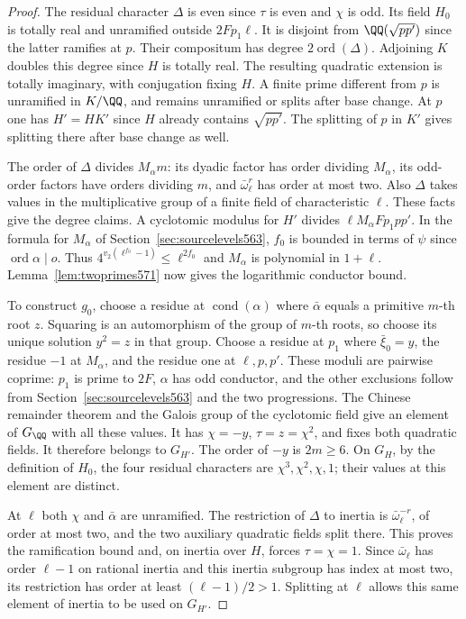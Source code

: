 \documentclass[a4paper,11pt]{article}
\theoremstyle{definition}
\theoremstyle{remark}
\numberwithin{equation}{section}
\begin{document}
\begin{proof}
The residual character \(\Delta\) is even since \(\tau\)
is even and \(\chi\) is odd. Its field \(H_0\) is totally
real and unramified outside \(2Fp_1\ell\). It is disjoint
from \(\QQ(\sqrt{pp'})\) since the latter ramifies at \(p\).
Their compositum has degree \(2\operatorname{ord}(\Delta)\).
Adjoining \(K\) doubles this degree since \(H\) is totally
real. The resulting quadratic extension is totally imaginary,
with conjugation fixing \(H\). A finite prime different
from \(p\) is unramified in \(K/\QQ\), and remains unramified
or splits after base change. At \(p\) one has \(H'=HK'\)
since \(H\) already contains \(\sqrt{pp'}\). The splitting
of \(p\) in \(K'\) gives splitting there after base change
as well.

The order of \(\Delta\) divides \(M_\alpha m\): its dyadic
factor has order dividing \(M_\alpha\), its odd-order factors
have orders dividing \(m\), and \(\bar\omega_\ell^r\) has
order at most two. Also \(\Delta\) takes values in the
multiplicative group of a finite field of characteristic
\(\ell\). These facts give the degree claims. A cyclotomic
modulus for \(H'\) divides \(\ell M_\alpha Fp_1pp'\).
In the formula for \(M_\alpha\) of
Section~\ref{sec:sourcelevels563}, \(f_0\) is bounded in terms
of \(\psi\) since \(\operatorname{ord}\alpha\mid o\).
Thus \(4^{v_2(\ell^{f_0}-1)}\le\ell^{2f_0}\) and \(M_\alpha\)
is polynomial in \(1+\ell\). Lemma~\ref{lem:twoprimes571}
now gives the logarithmic conductor bound.

To construct \(g_0\), choose a residue at
\(\operatorname{cond}(\alpha)\) where \(\bar\alpha\) equals
a primitive \(m\)-th root \(z\). Squaring is an automorphism
of the group of \(m\)-th roots, so choose its unique solution
\(y^2=z\) in that group. Choose a residue at \(p_1\) where
\(\bar\xi_0=y\), the residue \(-1\) at \(M_\alpha\), and
the residue one at \(\ell,p,p'\). These moduli are pairwise
coprime: \(p_1\) is prime to \(2F\), \(\alpha\) has odd
conductor, and the other exclusions follow from
Section~\ref{sec:sourcelevels563} and the two progressions.
The Chinese remainder theorem and the Galois group of the
cyclotomic field give an element of \(G_\QQ\) with all these
values. It has \(\chi=-y\), \(\tau=z=\chi^2\), and fixes
both quadratic fields. It therefore belongs to \(G_{H'}\).
The order of \(-y\) is \(2m\ge6\). On \(G_H\), by the
definition of \(H_0\), the four residual characters are
\(\chi^3,\chi^2,\chi,1\); their values at this element
are distinct.

At \(\ell\) both \(\chi\) and \(\bar\alpha\) are unramified.
The restriction of \(\Delta\) to inertia is
\(\bar\omega_\ell^{-r}\), of order at most two, and the
two auxiliary quadratic fields split there. This proves the
ramification bound and, on inertia over \(H\), forces
\(\tau=\chi=1\). Since \(\bar\omega_\ell\) has order
\(\ell-1\) on rational inertia and this inertia subgroup
has index at most two, its restriction has order at least
\((\ell-1)/2>1\). Splitting at \(\ell\) allows this same
element of inertia to be used on \(G_{H'}\).


\end{proof}
\end{document}
